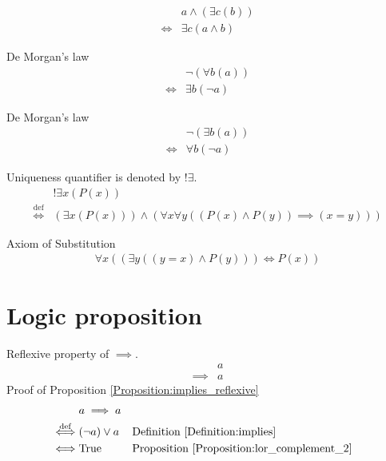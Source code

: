 \begin{prop}
\label{Proposition:land_exists_distributivity}
\begin{align*}
& a \land (\exists c (b)) \\
\iff & \exists c (a \land b)
\end{align*}
\end{prop}

\begin{prop}
\label{Proposition:De_Morgan_1}
De Morgan's law
\begin{align*}
& \lnot (\forall b (a)) \\
\iff & \exists b (\lnot a)
\end{align*}
\end{prop}

\begin{prop}
\label{Proposition:De_Morgan_2}
De Morgan's law
\begin{align*}
& \lnot (\exists b (a)) \\
\iff & \forall b (\lnot a)
\end{align*}
\end{prop}

\begin{defn}
\label{Definition:uniqueness_quantifier}
Uniqueness quantifier is denoted by $!\exists$.
\begin{align*}
& !\exists x (P(x)) \\
\overset{\operatorname{def}}{\iff} & (\exists x (P(x))) \land (\forall x \forall y ((P(x) \land P(y)) \implies (x = y)))
\end{align*}
\end{defn}

\begin{axm}
\label{Axiom:axiom_of_substitution}
Axiom of Substitution
\begin{align*}
\forall x ((\exists y ((y = x) \land P(y))) \iff P(x))
\end{align*}
\end{axm}

\section{Logic proposition}
\begin{prop}
\label{Proposition:implies_reflexive}
Reflexive property of $\implies$.
\begin{align*}
& a \\
\implies & a
\end{align*}
Proof of Proposition \ref{Proposition:implies_reflexive}
\begin{align*}
& a \implies a \\
\overset{\operatorname{def}}{\iff} & (\lnot a) \lor a
& & \text{Definition \ref{Definition:implies}} \\
\iff & \text{True}
& & \text{Proposition \ref{Proposition:lor_complement_2}} \\
\end{align*}
\end{prop}

